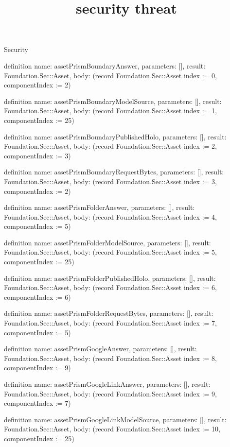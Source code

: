 \begin{lexlean}{Security}
\title{security threat}
\begin{semanticmodule}
definition{
  name: assetPrismBoundaryAnswer,
  parameters: [],
  result: Foundation.Sec::Asset,
  body: (record Foundation.Sec::Asset {index := 0, componentIndex := 2})
}

definition{
  name: assetPrismBoundaryModelSource,
  parameters: [],
  result: Foundation.Sec::Asset,
  body: (record Foundation.Sec::Asset {index := 1, componentIndex := 25})
}

definition{
  name: assetPrismBoundaryPublishedHolo,
  parameters: [],
  result: Foundation.Sec::Asset,
  body: (record Foundation.Sec::Asset {index := 2, componentIndex := 3})
}

definition{
  name: assetPrismBoundaryRequestBytes,
  parameters: [],
  result: Foundation.Sec::Asset,
  body: (record Foundation.Sec::Asset {index := 3, componentIndex := 2})
}

definition{
  name: assetPrismFolderAnswer,
  parameters: [],
  result: Foundation.Sec::Asset,
  body: (record Foundation.Sec::Asset {index := 4, componentIndex := 5})
}

definition{
  name: assetPrismFolderModelSource,
  parameters: [],
  result: Foundation.Sec::Asset,
  body: (record Foundation.Sec::Asset {index := 5, componentIndex := 25})
}

definition{
  name: assetPrismFolderPublishedHolo,
  parameters: [],
  result: Foundation.Sec::Asset,
  body: (record Foundation.Sec::Asset {index := 6, componentIndex := 6})
}

definition{
  name: assetPrismFolderRequestBytes,
  parameters: [],
  result: Foundation.Sec::Asset,
  body: (record Foundation.Sec::Asset {index := 7, componentIndex := 5})
}

definition{
  name: assetPrismGoogleAnswer,
  parameters: [],
  result: Foundation.Sec::Asset,
  body: (record Foundation.Sec::Asset {index := 8, componentIndex := 9})
}

definition{
  name: assetPrismGoogleLinkAnswer,
  parameters: [],
  result: Foundation.Sec::Asset,
  body: (record Foundation.Sec::Asset {index := 9, componentIndex := 7})
}

definition{
  name: assetPrismGoogleLinkModelSource,
  parameters: [],
  result: Foundation.Sec::Asset,
  body: (record Foundation.Sec::Asset {index := 10, componentIndex := 25})
}


\end{semanticmodule}
\end{lexlean}
